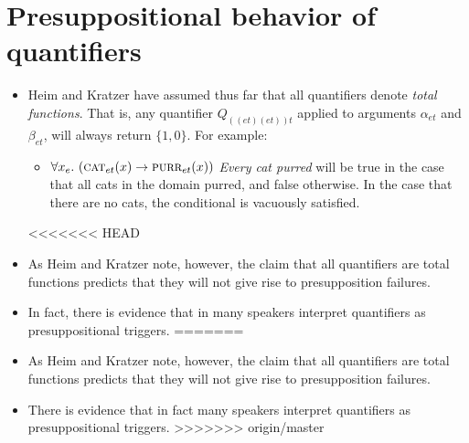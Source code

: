 \documentclass[a4paper]{article}
\begin{document}
\section{Presuppositional behavior of quantifiers}
\begin{itemize}
\item Heim and Kratzer have assumed thus far that all quantifiers denote \emph{total functions}. That is, any quantifier $Q_{((et)(et))t}$ applied to arguments $\alpha_{et}$ and $\beta_{et}$, will always return $\lbrace1, 0\rbrace$. For example:
\begin{itemize}
\item $\forall x_e.\ (\textsc{cat}_{et}(x) -> \textsc{purr}_{et}(x))$ \emph{Every cat purred} will be true in the case that all cats in the domain purred, and false otherwise. In the case that there are no cats, the conditional is vacuously satisfied.
\end{itemize}
<<<<<<< HEAD
\item As Heim and Kratzer note, however, the claim that all quantifiers are total functions predicts that they will not give rise to presupposition failures. 
\item In fact, there is evidence that in many speakers interpret quantifiers as presuppositional triggers. 
=======
\item As Heim and Kratzer note, however, the claim that all quantifiers are total functions predicts that they will not give rise to presupposition failures.
\item There is evidence that in fact many speakers interpret quantifiers as presuppositional triggers.
>>>>>>> origin/master
\end{itemize}
\end{document}
